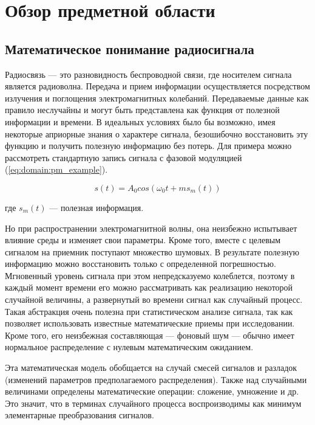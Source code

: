 \section{Обзор предметной области}
\label{sec:domain}

\subsection{Математическое понимание радиосигнала}

Радиосвязь --- это разновидность беспроводной связи, где носителем сигнала является радиоволна. Передача и прием информации осуществляется посредством излучения и поглощения электромагнитных колебаний.
Передаваемые данные как правило неслучайны и могут быть представлена как функция от полезной информации и времени. В идеальных условиях было бы возможно, имея некоторые априорные знания о характере сигнала, безошибочно восстановить эту функцию и получить полезную информацию без потерь. Для примера можно рассмотреть стандартную запись сигнала с фазовой модуляцией (\autoref{eq:domain:pm_example}).

\begin{equation}
  \label{eq:domain:pm_example}
  s(t) = A_0 cos(\omega_0 t + m s_m(t))
\end{equation}
\begin{explanation}
\item[где] $s_m(t)$ --- полезная информация.
\end{explanation}

Но при распространении электромагнитной волны, она неизбежно испытывает влияние среды и изменяет свои параметры. Кроме того, вместе с целевым сигналом на приемник поступают множество шумовых. В результате полезную информацию можно восстановить только с определенной погрешностью.
Мгновенный уровень сигнала при этом непредсказуемо колеблется, поэтому в каждый момент времени его можно рассматривать как реализацию некоторой случайной величины, а развернутый во времени сигнал как случайный процесс. Такая абстракция очень полезна при статистическом анализе сигнала, так как позволяет использовать известные математические приемы при исследовании. Кроме того, его неизбежная составляющая --- фоновый шум --- обычно имеет нормальное распределение с нулевым математическим ожиданием.

Эта математическая модель обобщается на случай смесей сигналов и разладок (изменений параметров предполагаемого распределения). Также над случайными величинами определены математические операции: сложение, умножение и др. Это значит, что в терминах случайного процесса воспроизводимы как минимум элементарные преобразования сигналов.


